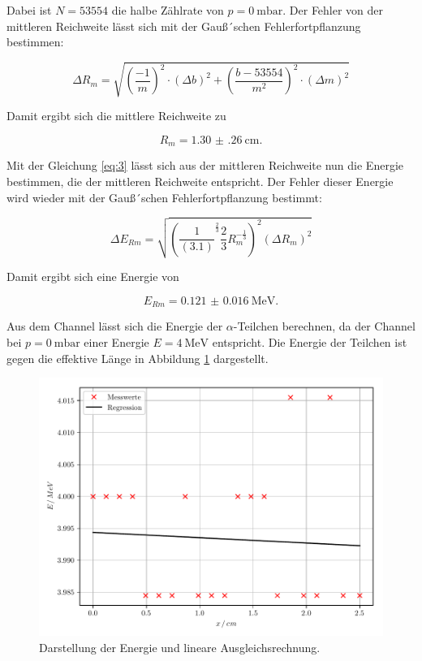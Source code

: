 Dabei ist $N = 53554$ die halbe Zählrate von $p = \SI{0}{\milli\bar}$.
Der Fehler von der mittleren Reichweite lässt sich mit der Gauß´schen Fehlerfortpflanzung
bestimmen:

\begin{equation*}
  \Delta R_m = \sqrt{\left( \frac{-1}{m} \right)^2 \cdot (\Delta b)^2 +
  \left( \frac{b-53554}{m^2} \right)^2 \cdot (\Delta m )^2}
\end{equation*}

Damit ergibt sich die mittlere Reichweite zu

\begin{equation*}
  R_m = \SI{1.30(26)}{\centi\meter}.
\end{equation*}

Mit der Gleichung \ref{eq:3} lässt sich aus der mittleren Reichweite nun die Energie
bestimmen, die der mittleren Reichweite entspricht. Der Fehler dieser Energie wird
wieder mit der Gauß´schen Fehlerfortpflanzung bestimmt:

\begin{equation*}
  \Delta E_{Rm} = \sqrt{\left( \frac{1}{(3.1)}^{\frac{2}{3}}\frac{2}{3} R_m^{-\frac{1}{3}} \right)^2
  (\Delta R_m)^2}
\end{equation*}

Damit ergibt sich eine Energie von

\begin{equation*}
  E_{Rm} = \SI{0.121(16)}{\mega\eV}.
\end{equation*}

Aus dem Channel lässt sich die Energie der $\alpha$-Teilchen berechnen, da der
Channel bei $p = \SI{0}{\milli\bar}$ einer Energie $E = \SI{4}{\mega\eV}$
entspricht. Die Energie der Teilchen ist gegen die effektive Länge in
Abbildung \ref{abb:3} dargestellt.

\begin{figure}[H]
  \centering
  \includegraphics{plot2.pdf}
  \caption{Darstellung der Energie und lineare Ausgleichsrechnung.}
  \label{abb:3}
\end{figure}

